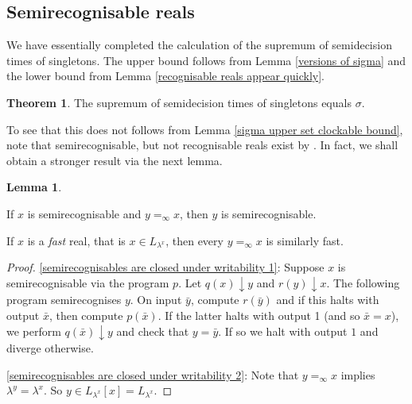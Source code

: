 \documentclass[a4paper,11pt]{amsart}
\theoremstyle{definition}
\newtheorem{theorem}[fact]{Theorem}
\newtheorem{lemma}[fact]{Lemma}
\newtheorem*{problem A}{Problem 1}
\newtheorem*{problem B}{Problem 2}
\theoremstyle{remark}
\newenvironment{enumerate-(1)}{\begin{enumerate}[label={\upshape (\arabic*)}, leftmargin=2pc]}{\end{enumerate}}
\begin{document}
\subsection{Semirecognisable reals} 
We have essentially completed the calculation of the supremum of semidecision times of singletons. 
The upper bound follows from Lemma \ref{versions of sigma} and the lower bound from Lemma \ref{recognisable reals appear quickly}. 

\begin{theorem} 
\label{supremum of semidecision times of semirecognisable singletons} 
The supremum of semidecision times of singletons equals $\sigma$. 
\end{theorem} 

To see that this does not follows from Lemma \ref{sigma upper set clockable bound}, note that semirecognisable, but not recognisable reals exist by \cite[Theorem 4.5.4]{carl2019ordinal}. 
In fact, we shall obtain a stronger result via the next lemma. 

\begin{lemma} \
\label{semirecognisables are closed under writability} 
\begin{enumerate-(1)} 
\item 
\label{semirecognisables are closed under writability 1} 
If $x$ is  semirecognisable  and $y=_{\infty}x$, then $y$ is semirecognisable. 
\item 
\label{semirecognisables are closed under writability 2} 
If $x$ is a \emph{fast} real, that is $x\in L_{\lambda^{x}}$, then every $y=_{\infty} x$ is similarly fast.
\end{enumerate-(1)} 
\end{lemma} 
\begin{proof} 
\ref{semirecognisables are closed under writability 1}: 
Suppose $x$ is semirecognisable via the program $p$. Let $q(x)\downarrow y$ and $r(y)\downarrow x$. 
The following program semirecognises $y$. 
On input $\bar y$, compute $r(\bar y)$ and if this halts with output $\bar x$, then compute $p(\bar x)$. If the latter halts with output 1 (and so $\bar x = x$), we perform $q(\bar x)\downarrow y$ and check that $y= \bar y$. If so we halt with output $1$ and diverge otherwise. 

\ref{semirecognisables are closed under writability 2}: 
Note that $y=_\infty x $ implies $ \lambda^{y}=\lambda^{x}$. So $y\in L_{\lambda^{x}}[x] = L_{\lambda^{x}}$. 
\end{proof}
\end{document}
